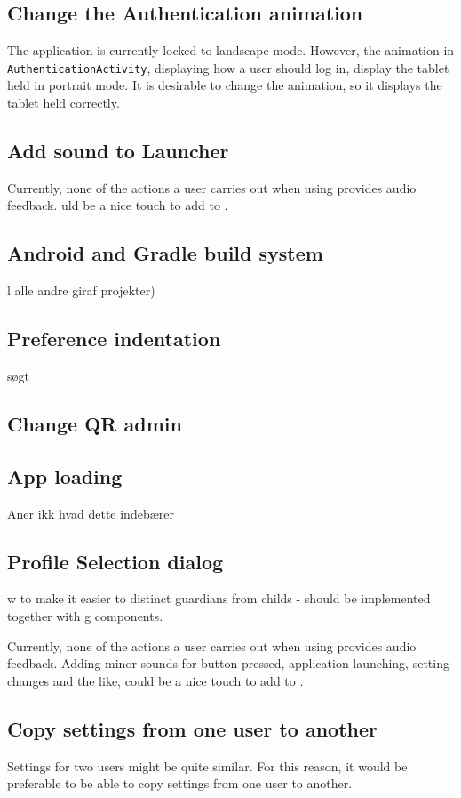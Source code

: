 \subsection{Change the Authentication animation}
The application is currently locked to landscape mode.
However, the animation in \lstinline!AuthenticationActivity!, displaying how a user should log in, display the tablet held in portrait mode.
It is desirable to change the animation, so it displays the tablet held correctly.

\subsection{Add sound to Launcher}
Currently, none of the actions a user carries out when using \launcher provides audio feedback.
uld be a nice touch to add to \launcher. 

\subsection{Android and Gradle build system}
l alle andre giraf projekter)

\subsection{Preference indentation}
søgt

\subsection{Change QR admin}

\subsection{App loading}

Aner ikk hvad dette indebærer

\subsection{Profile Selection dialog}
w to make it easier to distinct guardians from childs - should be implemented together with g components.

Currently, none of the actions a user carries out when using \launcher provides audio feedback.
Adding minor sounds for button pressed, application launching, setting changes and the like, could be a nice touch to add to \launcher. 

\subsection{Copy settings from one user to another}
Settings for two users might be quite similar.
For this reason, it would be preferable to be able to copy settings from one user to another.                                                                                   
                                                                                   
